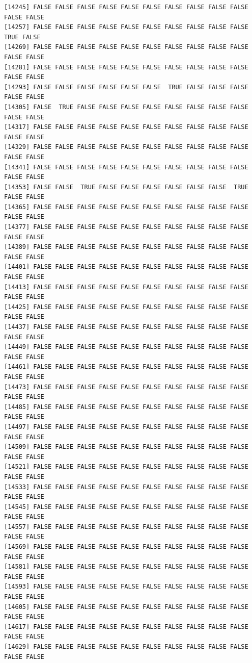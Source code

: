 \documentclass[
  a4paper,
  DIV=11,
  numbers=noendperiod]{scrartcl}
\begin{document}
\begin{verbatim}
[14245] FALSE FALSE FALSE FALSE FALSE FALSE FALSE FALSE FALSE FALSE FALSE FALSE
[14257] FALSE FALSE FALSE FALSE FALSE FALSE FALSE FALSE FALSE FALSE  TRUE FALSE
[14269] FALSE FALSE FALSE FALSE FALSE FALSE FALSE FALSE FALSE FALSE FALSE FALSE
[14281] FALSE FALSE FALSE FALSE FALSE FALSE FALSE FALSE FALSE FALSE FALSE FALSE
[14293] FALSE FALSE FALSE FALSE FALSE FALSE  TRUE FALSE FALSE FALSE FALSE FALSE
[14305] FALSE  TRUE FALSE FALSE FALSE FALSE FALSE FALSE FALSE FALSE FALSE FALSE
[14317] FALSE FALSE FALSE FALSE FALSE FALSE FALSE FALSE FALSE FALSE FALSE FALSE
[14329] FALSE FALSE FALSE FALSE FALSE FALSE FALSE FALSE FALSE FALSE FALSE FALSE
[14341] FALSE FALSE FALSE FALSE FALSE FALSE FALSE FALSE FALSE FALSE FALSE FALSE
[14353] FALSE FALSE  TRUE FALSE FALSE FALSE FALSE FALSE FALSE  TRUE FALSE FALSE
[14365] FALSE FALSE FALSE FALSE FALSE FALSE FALSE FALSE FALSE FALSE FALSE FALSE
[14377] FALSE FALSE FALSE FALSE FALSE FALSE FALSE FALSE FALSE FALSE FALSE FALSE
[14389] FALSE FALSE FALSE FALSE FALSE FALSE FALSE FALSE FALSE FALSE FALSE FALSE
[14401] FALSE FALSE FALSE FALSE FALSE FALSE FALSE FALSE FALSE FALSE FALSE FALSE
[14413] FALSE FALSE FALSE FALSE FALSE FALSE FALSE FALSE FALSE FALSE FALSE FALSE
[14425] FALSE FALSE FALSE FALSE FALSE FALSE FALSE FALSE FALSE FALSE FALSE FALSE
[14437] FALSE FALSE FALSE FALSE FALSE FALSE FALSE FALSE FALSE FALSE FALSE FALSE
[14449] FALSE FALSE FALSE FALSE FALSE FALSE FALSE FALSE FALSE FALSE FALSE FALSE
[14461] FALSE FALSE FALSE FALSE FALSE FALSE FALSE FALSE FALSE FALSE FALSE FALSE
[14473] FALSE FALSE FALSE FALSE FALSE FALSE FALSE FALSE FALSE FALSE FALSE FALSE
[14485] FALSE FALSE FALSE FALSE FALSE FALSE FALSE FALSE FALSE FALSE FALSE FALSE
[14497] FALSE FALSE FALSE FALSE FALSE FALSE FALSE FALSE FALSE FALSE FALSE FALSE
[14509] FALSE FALSE FALSE FALSE FALSE FALSE FALSE FALSE FALSE FALSE FALSE FALSE
[14521] FALSE FALSE FALSE FALSE FALSE FALSE FALSE FALSE FALSE FALSE FALSE FALSE
[14533] FALSE FALSE FALSE FALSE FALSE FALSE FALSE FALSE FALSE FALSE FALSE FALSE
[14545] FALSE FALSE FALSE FALSE FALSE FALSE FALSE FALSE FALSE FALSE FALSE FALSE
[14557] FALSE FALSE FALSE FALSE FALSE FALSE FALSE FALSE FALSE FALSE FALSE FALSE
[14569] FALSE FALSE FALSE FALSE FALSE FALSE FALSE FALSE FALSE FALSE FALSE FALSE
[14581] FALSE FALSE FALSE FALSE FALSE FALSE FALSE FALSE FALSE FALSE FALSE FALSE
[14593] FALSE FALSE FALSE FALSE FALSE FALSE FALSE FALSE FALSE FALSE FALSE FALSE
[14605] FALSE FALSE FALSE FALSE FALSE FALSE FALSE FALSE FALSE FALSE FALSE FALSE
[14617] FALSE FALSE FALSE FALSE FALSE FALSE FALSE FALSE FALSE FALSE FALSE FALSE
[14629] FALSE FALSE FALSE FALSE FALSE FALSE FALSE FALSE FALSE FALSE FALSE FALSE

\end{verbatim}
\end{document}
